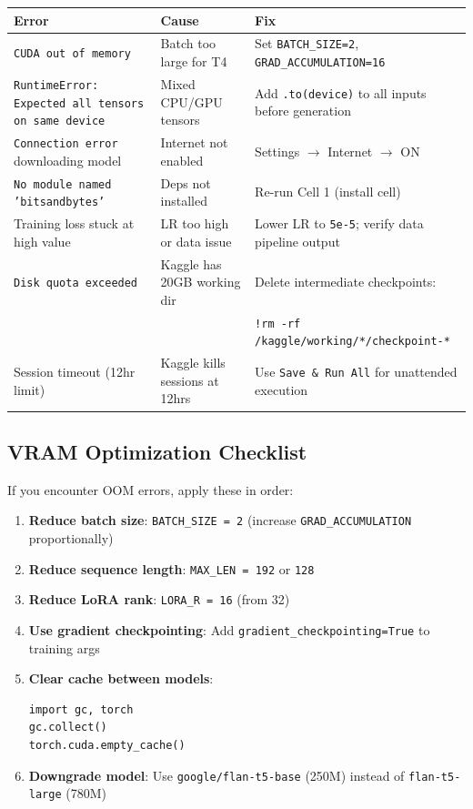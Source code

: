 \documentclass[11pt, a4paper]{article}
\begin{document}
\begin{table}[h]
\centering
\small
\begin{tabular}{p{4cm}p{4cm}p{4cm}}
\toprule
\textbf{Error} & \textbf{Cause} & \textbf{Fix} \\
\midrule
\texttt{CUDA out of memory} & Batch too large for T4 & Set \texttt{BATCH\_SIZE=2}, \texttt{GRAD\_ACCUMULATION=16} \\
\midrule
\texttt{RuntimeError: Expected all tensors on same device} & Mixed CPU/GPU tensors & Add \texttt{.to(device)} to all inputs before generation \\
\midrule
\texttt{Connection error} downloading model & Internet not enabled & Settings $\rightarrow$ Internet $\rightarrow$ ON \\
\midrule
\texttt{No module named 'bitsandbytes'} & Deps not installed & Re-run Cell 1 (install cell) \\
\midrule
Training loss stuck at high value & LR too high or data issue & Lower LR to \texttt{5e-5}; verify data pipeline output \\
\midrule
\texttt{Disk quota exceeded} & Kaggle has 20GB working dir & Delete intermediate checkpoints: \\
& & \texttt{!rm -rf /kaggle/working/*/checkpoint-*} \\
\midrule
Session timeout (12hr limit) & Kaggle kills sessions at 12hrs & Use \texttt{Save \& Run All} for unattended execution \\
\bottomrule
\end{tabular}
\end{table}

\subsection{VRAM Optimization Checklist}

If you encounter OOM errors, apply these in order:

\begin{enumerate}
    \item \textbf{Reduce batch size}: \texttt{BATCH\_SIZE = 2} (increase \texttt{GRAD\_ACCUMULATION} proportionally)
    \item \textbf{Reduce sequence length}: \texttt{MAX\_LEN = 192} or \texttt{128}
    \item \textbf{Reduce LoRA rank}: \texttt{LORA\_R = 16} (from 32)
    \item \textbf{Use gradient checkpointing}: Add \texttt{gradient\_checkpointing=True} to training args
    \item \textbf{Clear cache between models}:
\begin{lstlisting}[style=python]
import gc, torch
gc.collect()
torch.cuda.empty_cache()
\end{lstlisting}
    \item \textbf{Downgrade model}: Use \texttt{google/flan-t5-base} (250M) instead of \texttt{flan-t5-large} (780M)
\end{enumerate}
\end{document}
